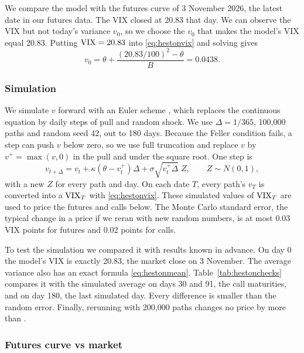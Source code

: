 We compare the model with the futures curve of 3 November 2026, the latest date in our futures data. The VIX closed at 20.83 that day. We can observe the VIX but not today's variance $v_0$, so we choose the $v_0$ that makes the model's VIX equal 20.83. Putting $\mathrm{VIX} = 20.83$ into \eqref{eq:hestonvix} and solving gives
\[
  v_0 = \theta + \frac{(20.83/100)^2 - \theta}{B} = 0.0438 .
\]

\subsubsection{Simulation}
\label{sec:hestonsim}

We simulate $v$ forward with an Euler scheme \cite{gatheral}, which replaces the continuous equation by daily steps of pull and random shock. We use $\Delta = 1/365$, 100{,}000 paths and random seed 42, out to 180 days. Because the Feller condition fails, a step can push $v$ below zero, so we use full truncation and replace $v$ by $v^+ = \max(v,0)$ in the pull and under the square root. One step is
\[
  v_{t+\Delta} = v_t + \kappa(\theta - v_t^+)\Delta + \sigma\sqrt{v_t^+\Delta}\;Z, \qquad Z\sim N(0,1),
\]
with a new $Z$ for every path and day. On each date $T$, every path's $v_T$ is converted into a $\mathrm{VIX}_T$ with \eqref{eq:hestonvix}. These simulated values of $\mathrm{VIX}_T$ are used to price the futures and calls below. The Monte Carlo standard error, the typical change in a price if we reran with new random numbers, is at most 0.03 VIX points for futures and 0.02 points for calls.

To test the simulation we compared it with results known in advance. On day 0 the model's VIX is exactly 20.83, the market close on 3 November. The average variance also has an exact formula \eqref{eq:hestonmean}. Table~\ref{tab:hestonchecks} compares it with the simulated average on days 30 and 91, the call maturities, and on day 180, the last simulated day. Every difference is smaller than the random error. Finally, rerunning with 200{,}000 paths changes no price by more than \unskip.

\begin{table}[H]
\centering
\small

\caption{Simulated against exact average variance. The random error is two standard errors, the range within which about 95\% of reruns would fall.}
\label{tab:hestonchecks}
\end{table}

\subsubsection{Futures curve vs market}

